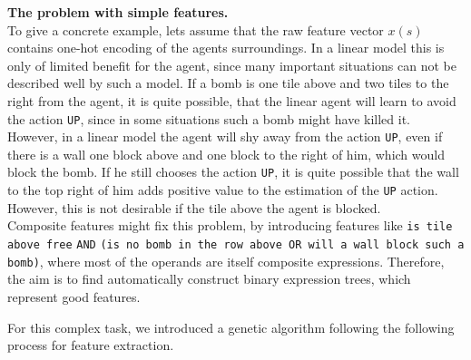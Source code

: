\textbf{The problem with simple features.} \\

To give a concrete example, lets assume that the raw feature vector $x(s)$ contains one-hot encoding of the agents surroundings. In a linear model this is only of limited benefit for the agent, since many important situations can not be described well by such a model. If a bomb is one tile above and two tiles to the right from the agent, it is quite possible, that the linear agent will learn to avoid the action \texttt{UP}, since in some situations such a bomb might have killed it. However, in a linear model the agent will shy away from the action \texttt{UP}, even if there is a wall one block above and one block to the right of him, which would block the bomb. If he still chooses the action \texttt{UP}, it is quite possible that the wall to the top right of him adds positive value to the estimation of the \texttt{UP} action. However, this is not desirable if the tile above the agent is blocked. \\

Composite features might fix this problem, by introducing features like \texttt{is tile above free} \texttt{AND} \texttt{(is no bomb in the row above OR will a wall block such a bomb)}, \linebreak where most of the operands are itself composite expressions. Therefore, the aim is to find automatically construct binary expression trees, which represent good features. \pagebreak 

For this complex task, we introduced a genetic algorithm following the following process for feature extraction.

